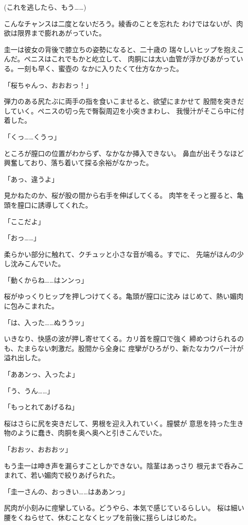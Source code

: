 ﻿\documentclass[
    book,tate,
    line_length=30zw,
    jafontsize=12pt,
    paper=b5j,
    landscape,
    ]{jlreq}
\begin{document}
(これを逃したら、もう……)

こんなチャンスは二度とないだろう。綾香のことを忘れた
わけではないが、肉欲は限界まで膨れあがっていた。

圭一は彼女の背後で膝立ちの姿勢になると、二十歳の
瑞々しいヒップを抱えこんだ。ペニスはこれでもかと屹立して、
肉胴には太い血管が浮かびあがっている。一刻も早く、蜜壺の
なかに入りたくて仕方なかった。

「桜ちゃんっ、おおおっ！」

弾力のある尻たぶに両手の指を食いこませると、欲望にまかせて
股間を突きだしていく。ペニスの切っ先で臀裂周辺を小突きまわし、
我慢汁がそこら中に付着した。

「くっ……くうっ」

ところが膣口の位置がわからず、なかなか挿入できない。
鼻血が出そうなほど興奮しており、落ち着いて探る余裕がなかった。

「あっ、違うよ」

見かねたのか、桜が股の間から右手を伸ばしてくる。
肉竿をそっと握ると、亀頭を膣口に誘導してくれた。

「ここだよ」

「おっ……」

柔らかい部分に触れて、クチュッと小さな音が鳴る。すでに、
先端がほんの少し沈みこんでいた。

「動くからね……はンンっ」

桜がゆっくりヒップを押しつけてくる。亀頭が膣口に沈み
はじめて、熱い媚肉に包みこまれた。

「は、入った……ぬううッ」

いきなり、快感の波が押し寄せてくる。カリ首を膣口で強く
締めつけられるのも、たまらない刺激だ。股間から全身に
痙攣がひろがり、新たなカウパー汁が溢れ出した。

「ああンっ、入ったよ」

「う、うん……」

「もっとれてあげるね」

桜はさらに尻を突きだして、男根を迎え入れていく。膣襞が
意思を持った生き物のように蠢き、肉胴を奥へ奥へと引きこんでいた。

「おおッ、おおおッ」

もう圭一は呻き声を漏らすことしかできない。陰茎はあっさり
根元まで呑みこまれて、若い媚肉で絞りあげられた。

「圭一さんの、おっきい……はああンっ」

尻肉が小刻みに痙攣している。どうやら、本気で感じているらしい。
桜は細い腰をくねらせて、休むことなくヒップを前後に揺らしはじめた。
\end{document}
